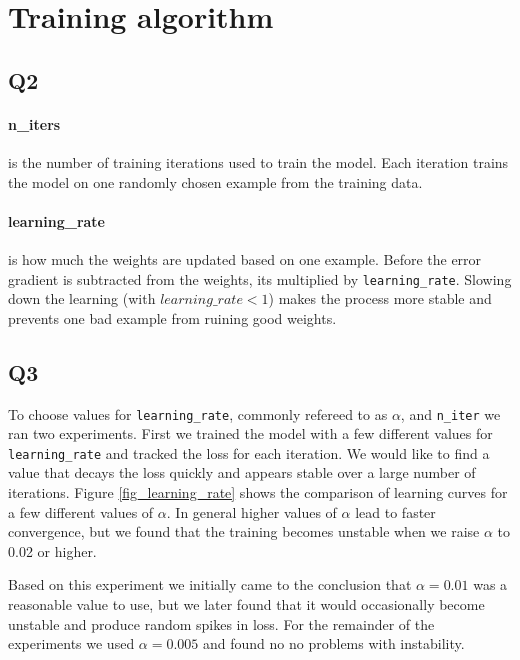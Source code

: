 \documentclass[12pt]{article}
\begin{document}

\section{Training algorithm}

\subsection{Q2}

\paragraph{n\_iters} is the number of training iterations used to train the model. Each iteration trains the model on one randomly chosen example from the training data.

\paragraph{learning\_rate} is how much the weights are updated based on one example. Before the error gradient is subtracted from the weights, its multiplied by \texttt{learning\_rate}. Slowing down the learning (with $learning\_rate < 1$) makes the process more stable and prevents one bad example from ruining good weights.


\subsection{Q3}

To choose values for \texttt{learning\_rate}, commonly refereed to as $\alpha$, and \texttt{n\_iter} we ran two experiments. 
First we trained the model with a few different values for \texttt{learning\_rate} and tracked the loss for each iteration. We would like to find a value that decays the loss quickly and appears stable over a large number of iterations.
Figure \ref{fig_learning_rate} shows the comparison of learning curves for a few different values of $\alpha$. In general higher values of $\alpha$ lead to faster convergence, but we found that the training becomes unstable when we raise $\alpha$ to 0.02 or higher. 

Based on this experiment we initially came to the conclusion that $\alpha = 0.01$ was a reasonable value to use, but we later found that it would occasionally become unstable and produce random spikes in loss. For the remainder of the experiments we used $\alpha = 0.005$ and found no no problems with instability.
\end{document}
